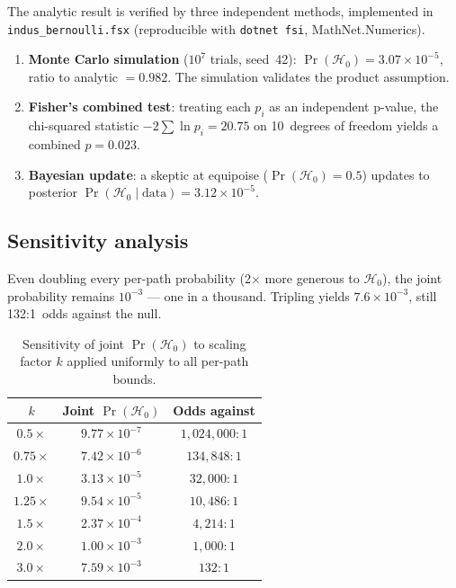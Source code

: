 The analytic result is verified by three independent methods,
implemented in \texttt{indus\_bernoulli.fsx} (reproducible with
\texttt{dotnet fsi}, MathNet.Numerics).

\begin{enumerate}[nosep]
\item \textbf{Monte Carlo simulation} ($10^7$ trials, seed~42):
  $\Pr(\mathcal{H}_0) = 3.07 \times 10^{-5}$, ratio to analytic
  $= 0.982$. The simulation validates the product assumption.
\item \textbf{Fisher's combined test}: treating each $p_i$ as an
  independent p-value, the chi-squared statistic $-2\sum\ln p_i =
  20.75$ on 10~degrees of freedom yields a combined $p = 0.023$.
\item \textbf{Bayesian update}: a skeptic at equipoise
  ($\Pr(\mathcal{H}_0) = 0.5$) updates to posterior
  $\Pr(\mathcal{H}_0 \mid \text{data}) = 3.12 \times 10^{-5}$.
\end{enumerate}

\subsection{Sensitivity analysis}

Even doubling every per-path probability (2$\times$
more generous to $\mathcal{H}_0$), the joint probability remains
$10^{-3}$ --- one in a thousand. Tripling yields $7.6 \times
10^{-3}$, still 132:1~odds against the null.

\begin{table}[h!]
\centering\small
\caption{Sensitivity of joint $\Pr(\mathcal{H}_0)$ to scaling
factor $k$ applied uniformly to all per-path bounds.}
\label{tab:sensitivity}
\begin{tabular}{@{}ccc@{}}
\toprule
$k$ & Joint $\Pr(\mathcal{H}_0)$ & Odds against \\
\midrule
$0.5\times$ & $9.77 \times 10^{-7}$ & $1{,}024{,}000:1$ \\
$0.75\times$ & $7.42 \times 10^{-6}$ & $134{,}848:1$ \\
$1.0\times$ & $3.13 \times 10^{-5}$ & $32{,}000:1$ \\
$1.25\times$ & $9.54 \times 10^{-5}$ & $10{,}486:1$ \\
$1.5\times$ & $2.37 \times 10^{-4}$ & $4{,}214:1$ \\
$2.0\times$ & $1.00 \times 10^{-3}$ & $1{,}000:1$ \\
$3.0\times$ & $7.59 \times 10^{-3}$ & $132:1$ \\
\bottomrule
\end{tabular}
\end{table}

